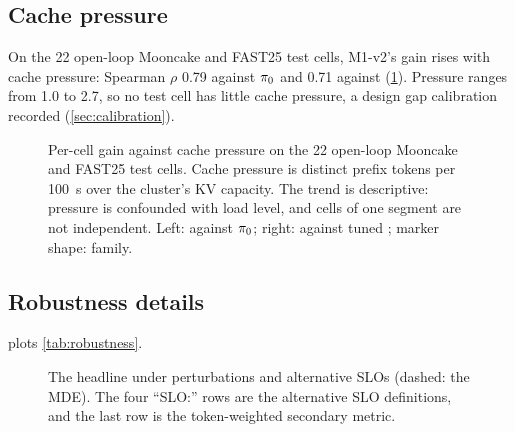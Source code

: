 \subsection{Cache pressure}

On the 22 open-loop Mooncake and FAST25 test cells, M1-v2's gain rises with cache pressure: Spearman
$\rho$ 0.79 against $\pi_{0}$ and 0.71 against  (\cref{fig:cache-pressure}). Pressure
ranges from 1.0 to 2.7, so no test cell has little cache pressure, a design gap calibration recorded
(\cref{sec:calibration}).

\begin{figure}[tbp]
  \centering
  
  \caption{Per-cell gain against cache pressure on the 22 open-loop Mooncake and FAST25 test cells.
    Cache pressure is distinct prefix tokens per \SI{100}{s} over
    the cluster's KV capacity. The trend is descriptive: pressure is confounded with load level, and
    cells of one segment are not independent. Left: against $\pi_{0}$; right: against tuned
    ; marker shape: family.}
  \label{fig:cache-pressure}
\end{figure}

\subsection{Robustness details}

 plots \cref{tab:robustness}.

\begin{figure}[tbp]
  \centering
  
  \caption{The headline under perturbations and alternative SLOs (dashed: the MDE). The four
    ``SLO:'' rows are the alternative SLO definitions, and the last row is the token-weighted
    secondary metric.}
  \label{fig:robustness}
\end{figure}

